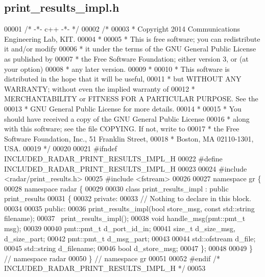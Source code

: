 \subsection{print\+\_\+results\+\_\+impl.\+h}
\label{print__results__impl_8h_source}

\begin{DoxyCode}
00001 \textcolor{comment}{/* -*- c++ -*- */}
00002 \textcolor{comment}{/* }
00003 \textcolor{comment}{ * Copyright 2014 Communications Engineering Lab, KIT.}
00004 \textcolor{comment}{ * }
00005 \textcolor{comment}{ * This is free software; you can redistribute it and/or modify}
00006 \textcolor{comment}{ * it under the terms of the GNU General Public License as published by}
00007 \textcolor{comment}{ * the Free Software Foundation; either version 3, or (at your option)}
00008 \textcolor{comment}{ * any later version.}
00009 \textcolor{comment}{ * }
00010 \textcolor{comment}{ * This software is distributed in the hope that it will be useful,}
00011 \textcolor{comment}{ * but WITHOUT ANY WARRANTY; without even the implied warranty of}
00012 \textcolor{comment}{ * MERCHANTABILITY or FITNESS FOR A PARTICULAR PURPOSE.  See the}
00013 \textcolor{comment}{ * GNU General Public License for more details.}
00014 \textcolor{comment}{ * }
00015 \textcolor{comment}{ * You should have received a copy of the GNU General Public License}
00016 \textcolor{comment}{ * along with this software; see the file COPYING.  If not, write to}
00017 \textcolor{comment}{ * the Free Software Foundation, Inc., 51 Franklin Street,}
00018 \textcolor{comment}{ * Boston, MA 02110-1301, USA.}
00019 \textcolor{comment}{ */}
00020  
00021 \textcolor{preprocessor}{#ifndef INCLUDED\_RADAR\_PRINT\_RESULTS\_IMPL\_H}
00022 \textcolor{preprocessor}{#define INCLUDED\_RADAR\_PRINT\_RESULTS\_IMPL\_H}
00023 
00024 \textcolor{preprocessor}{#include <radar/print_results.h>}
00025 \textcolor{preprocessor}{#include <fstream>}
00026 
00027 \textcolor{keyword}{namespace }gr \{
00028   \textcolor{keyword}{namespace }radar \{
00029 
00030     \textcolor{keyword}{class }print_results_impl : \textcolor{keyword}{public} print_results
00031     \{
00032      \textcolor{keyword}{private}:
00033       \textcolor{comment}{// Nothing to declare in this block.}
00034 
00035      \textcolor{keyword}{public}:
00036       print_results_impl(\textcolor{keywordtype}{bool} store\_msg, \textcolor{keyword}{const} std::string filename);
00037       ~print_results_impl();
00038       \textcolor{keywordtype}{void} handle_msg(pmt::pmt\_t msg);
00039       
00040       pmt::pmt\_t d_port_id_in;
00041       \textcolor{keywordtype}{size\_t} d_size_msg, d_size_part;
00042       pmt::pmt\_t d_msg_part;
00043       
00044       std::ofstream d_file;
00045       std::string d_filename;
00046       \textcolor{keywordtype}{bool} d_store_msg;
00047     \};
00048 
00049   \} \textcolor{comment}{// namespace radar}
00050 \} \textcolor{comment}{// namespace gr}
00051 
00052 \textcolor{preprocessor}{#endif }\textcolor{comment}{/* INCLUDED\_RADAR\_PRINT\_RESULTS\_IMPL\_H */}\textcolor{preprocessor}{}
00053 
\end{DoxyCode}
